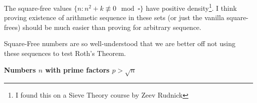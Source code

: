 \documentclass[12pt]{article}
\begin{document}
\newpage

\noindent The square-free values $\{ n : n^2+ k \not \equiv 0 \mod \square \}$ have positive density\footnote{I found this on a Sieve Theory course by Zeev Rudnick}.  I think proving existence of arithmetic sequence in these sets (or just the vanilla square-frees) should be much easier than proving for arbitrary sequence. \newline

\noindent Square-Free numbers are so well-understood that we are better off not using these sequences to test Roth's Theorem. \newline

\noindent 

\newpage

\noindent \textbf{Numbers $n$ with prime factors $p > \sqrt{n}$} \newline \newline
\end{document}
